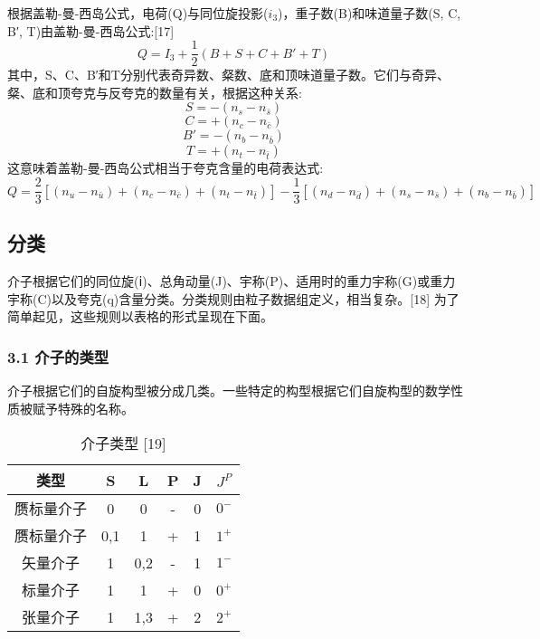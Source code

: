 根据盖勒-曼-西岛公式，电荷(Q)与同位旋投影($i_3$)，重子数(B)和味道量子数(S, C, B′, T)由盖勒-曼-西岛公式:[17]\begin{equation}
Q=I_3+\frac{1}{2}(B+S+C+B'+T)~
\end{equation}
其中，S、C、B′和T分别代表奇异数、粲数、底和顶味道量子数。它们与奇异、粲、底和顶夸克与反夸克的数量有关，根据这种关系:
\begin{equation}
S=-(n_s-n_{\bar s})
~
\end{equation}
\begin{equation}
C=+(n_c-n_{\bar c})~
\end{equation}
\begin{equation}
B'=-(n_b-n_{\bar b})~
\end{equation}
\begin{equation}
T=+(n_t-n_{\bar t})~
\end{equation}
这意味着盖勒-曼-西岛公式相当于夸克含量的电荷表达式:\begin{equation}
Q=\frac{2}{3}[(n_u-n_{\bar u})+(n_c-n_{\bar c})+(n_t-n_{\bar t})]-\frac{1}{3}[(n_d-n_{\bar d})+(n_s-n_{\bar s})+(n_b-n_{\bar b})]~
\end{equation}
\subsection{分类}
介子根据它们的同位旋(ⅰ)、总角动量(J)、宇称(P)、适用时的重力宇称(G)或重力宇称(C)以及夸克(q)含量分类。分类规则由粒子数据组定义，相当复杂。[18] 为了简单起见，这些规则以表格的形式呈现在下面。
\subsubsection{3.1 介子的类型}
介子根据它们的自旋构型被分成几类。一些特定的构型根据它们自旋构型的数学性质被赋予特殊的名称。
\begin{table}[ht]
\centering
\caption{介子类型  [19]}\label{tab_JZ2}
\begin{tabular}{|c|c|c|c|c|c|}
\hline
类型 & S& L & P & J & $J^P$\\
\hline
赝标量介子 & 0 & 0 & - & 0 &$ 0^-$ \\
\hline
赝标量介子 & 0,1 & 1 & + & 1 &$ 1^+$ \\
\hline
矢量介子 & 1 & 0,2 & - & 1 & $ 1^-$ \\
\hline
标量介子& 1&1 & + &  0& $ 0^+$\\
\hline
张量介子  & 1& 1,3 &+ & 2 &$2^+$\\
\hline
\end{tabular}
\end{table}
